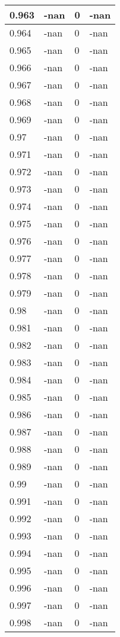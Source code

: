 \documentclass[a4paper,14pt]{extarticle}
\begin{document}
\begin{longtable}{||m{3cm}||m{3cm}|m{3cm}||m{3cm}||}
\hline
0.963 & -nan & 0 & -nan\\
\hline
0.964 & -nan & 0 & -nan\\
\hline
0.965 & -nan & 0 & -nan\\
\hline
0.966 & -nan & 0 & -nan\\
\hline
0.967 & -nan & 0 & -nan\\
\hline
0.968 & -nan & 0 & -nan\\
\hline
0.969 & -nan & 0 & -nan\\
\hline
0.97 & -nan & 0 & -nan\\
\hline
0.971 & -nan & 0 & -nan\\
\hline
0.972 & -nan & 0 & -nan\\
\hline
0.973 & -nan & 0 & -nan\\
\hline
0.974 & -nan & 0 & -nan\\
\hline
0.975 & -nan & 0 & -nan\\
\hline
0.976 & -nan & 0 & -nan\\
\hline
0.977 & -nan & 0 & -nan\\
\hline
0.978 & -nan & 0 & -nan\\
\hline
0.979 & -nan & 0 & -nan\\
\hline
0.98 & -nan & 0 & -nan\\
\hline
0.981 & -nan & 0 & -nan\\
\hline
0.982 & -nan & 0 & -nan\\
\hline
0.983 & -nan & 0 & -nan\\
\hline
0.984 & -nan & 0 & -nan\\
\hline
0.985 & -nan & 0 & -nan\\
\hline
0.986 & -nan & 0 & -nan\\
\hline
0.987 & -nan & 0 & -nan\\
\hline
0.988 & -nan & 0 & -nan\\
\hline
0.989 & -nan & 0 & -nan\\
\hline
0.99 & -nan & 0 & -nan\\
\hline
0.991 & -nan & 0 & -nan\\
\hline
0.992 & -nan & 0 & -nan\\
\hline
0.993 & -nan & 0 & -nan\\
\hline
0.994 & -nan & 0 & -nan\\
\hline
0.995 & -nan & 0 & -nan\\
\hline
0.996 & -nan & 0 & -nan\\
\hline
0.997 & -nan & 0 & -nan\\
\hline
0.998 & -nan & 0 & -nan\\

\end{longtable}
\end{document}
